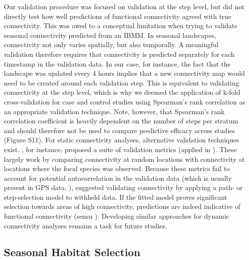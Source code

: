 \documentclass[abstract=on,10pt,a4paper,bibliography=totocnumbered]{article}
\begin{document}
Our validation procedure was focused on validation at the step level, but did
not directly test how well predictions of functional connectivity agreed with
true connectivity. This was owed to a conceptual limitation when trying to
validate seasonal connectivity predicted from an IBMM. In seasonal landscapes,
connectivity not only varies spatially, but also temporally. A meaningful
validation therefore requires that connectivity is predicted separately for each
timestamp in the validation data. In our case, for instance, the fact that the
landscape was updated every 4 hours implies that a new connectivity map would
need to be created around each validation step. This is equivalent to validating
connectivity at the step level, which is why we deemed the application of k-fold
cross-validation for case and control studies using Spearman's rank correlation
as an appropriate validation technique. Note, however, that Spearman's rank
correlation coefficient is heavily dependent on the number of steps per stratum
and should therefore not be used to compare predictive efficacy across studies
(Figure S11). For static connectivity analyses, alternative validation
techniques exist. \citet{McClure.2016}, for instance, proposed a suite of
validation metrics (applied in \citealp{Zeller.2018, Finerty.2023}). These
largely work by comparing connectivity at random locations with connectivity at
locations where the focal species was observed. Because these metrics fail to
account for potential autocorrelation in the validation data (which is usually
present in GPS data; \citep{Otis.1999}), \citet{Brennan.2020} suggested
validating connectivity by applying a path- or step-selection model to withheld
data. If the fitted model proves significant selection towards areas of high
connectivity, predictions are indeed indicative of functional connectivity
(sensu \citealp{Brennan.2020}). Developing similar approaches for dynamic
connectivity analyses remains a task for future studies.

\subsection{Seasonal Habitat Selection}

\end{document}
